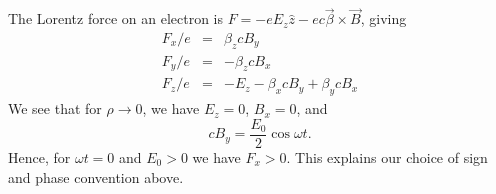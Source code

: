 The Lorentz force on an electron is $F = -e E_z \hat{z} - e c \vec{\beta} \times \vec{B}$,
giving
\begin{eqnarray}
F_x/e & = & \beta_z c B_y \\
F_y/e & = & -\beta_z c B_x \\
F_z/e & = & -E_z - \beta_x c B_y + \beta_y c B_x 
\end{eqnarray}
We see that for $\rho \rightarrow 0$, we have $E_z = 0$, $B_x = 0$, and
\begin{equation}
c B_y = \frac{E_0}{2} \cos \omega t.
\end{equation}
Hence, for $\omega t=0$ and $E_0>0$ we have $F_x>0$.  This explains
our choice of sign and phase convention above.
